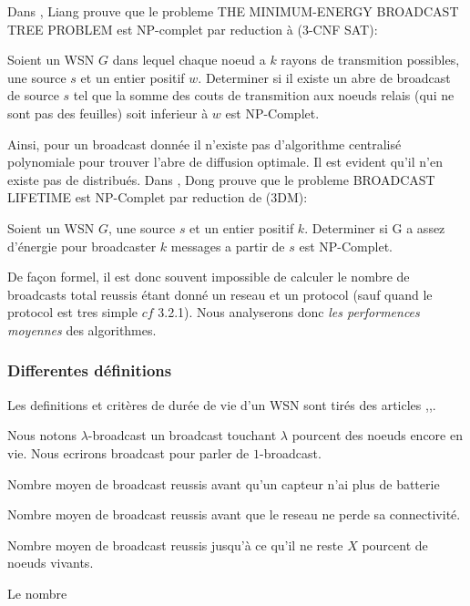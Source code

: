 Dans \cite{Liang2002}, Liang prouve que le  probleme THE MINIMUM-ENERGY BROADCAST
TREE PROBLEM est NP-complet par reduction à (3-CNF SAT):
\begin{myth}
Soient un WSN $G$ dans lequel chaque noeud a $k$ rayons de transmition possibles, une source $s$ et un entier positif $w$.
Determiner si il existe un abre de broadcast de source $s$ tel que la somme des couts de transmition aux noeuds relais (qui ne sont pas des feuilles) soit inferieur à $w$ est NP-Complet.
\end{myth}
Ainsi, pour un broadcast donnée il n'existe pas d'algorithme centralisé polynomiale pour trouver l'abre de diffusion optimale. Il est evident qu'il n'en existe pas de distribués. 
Dans \cite{Dong2005}, Dong prouve que le  probleme BROADCAST LIFETIME est NP-Complet par reduction de (3DM):
\begin{myth}
Soient un WSN $G$, une source $s$ et un entier positif $k$.
Determiner si G a assez d'énergie pour broadcaster $k$ messages a partir de $s$ est NP-Complet.
\end{myth}

De façon formel, il est donc souvent impossible de calculer le nombre de broadcasts total reussis étant donné un reseau et un protocol (sauf quand le protocol est tres simple $cf$ 3.2.1). Nous analyserons 
donc \textit{les performences moyennes} des algorithmes.

\subsubsection{Differentes définitions}
Les definitions et critères de durée de vie d'un WSN sont tirés des articles \cite{Dietrich2009},\cite{Champ2009lifetime},\cite{Elleithy2011}. 

\begin{mydef}
Nous notons $\lambda$-broadcast un broadcast touchant $\lambda$ pourcent des noeuds encore en vie. Nous ecrirons broadcast pour parler de $1$-broadcast.
\end{mydef}

\begin{mylt}
Nombre moyen de broadcast reussis avant qu'un capteur n'ai plus de batterie
\end{mylt}
\begin{mylt}
Nombre moyen de broadcast reussis avant que le reseau ne perde sa connectivité.
\end{mylt}
\begin{mylt}
Nombre moyen de broadcast reussis jusqu'à ce qu'il ne reste $X$ pourcent de noeuds vivants.
\end{mylt}
\begin{mylt}
Le nombre 
\end{mylt}



